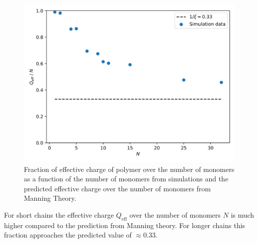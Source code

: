 \begin{figure}[H]
	\centering
	\includegraphics[width=\columnwidth]{Analysis_1/Q_effs}
	\captionsetup{width=\columnwidth}
	\caption{Fraction of effective charge of polymer over the number of monomers as a function of the number of monomers from simulations and the predicted effective charge over the number of monomers from Manning Theory.}
	\label{fig:q_effs}
\end{figure}
For short chains the effective charge $Q_\text{eff}$ over the number of monomers $N$ is much higher compared to the prediction from Manning theory. For longer chains this fraction approaches the predicted value of $\approx 0.33$.